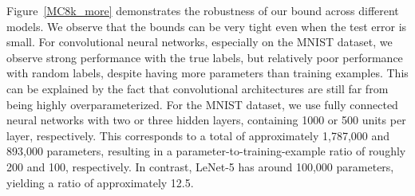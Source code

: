 \documentclass{article} %
\begin{document}
Figure~\ref{MC8k_more} demonstrates the robustness of our bound across different models.  We observe that the bounds can be very tight even when the test error is small. For convolutional neural networks, especially on the MNIST dataset, we observe strong performance with the true labels, but relatively poor performance with random labels, despite having more parameters than training examples. This can be explained by the fact that convolutional architectures are still far from being highly overparameterized. For the MNIST dataset, we use fully connected neural networks with two or three hidden layers, containing 1000 or 500 units per layer, respectively. This corresponds to a total of approximately 1,787,000 and 893,000 parameters, resulting in a parameter-to-training-example ratio of roughly 200 and 100, respectively. In contrast, LeNet-5 has around 100,000 parameters, yielding a ratio of approximately 12.5.
\end{document}
